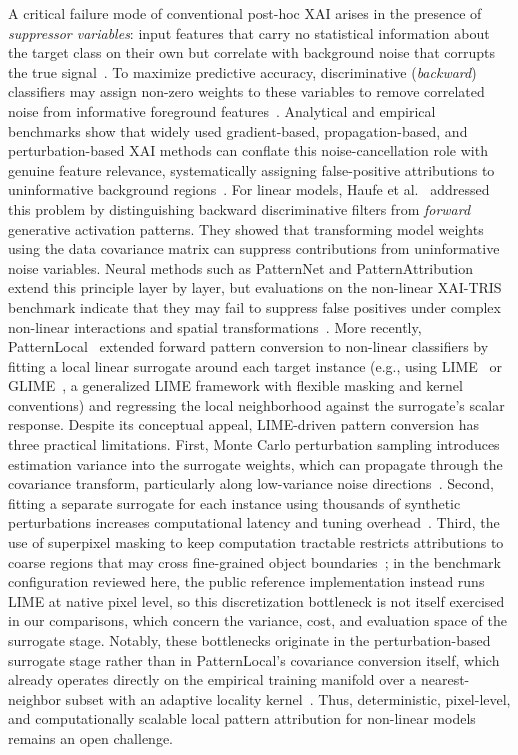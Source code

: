 \documentclass[pdflatex,sn-mathphys-num]{sn-jnl}
\theoremstyle{thmstyleone}
\theoremstyle{thmstyletwo}%
\theoremstyle{thmstylethree}%
\begin{document}
A critical failure mode of conventional post-hoc XAI arises in the presence of \emph{suppressor variables}: input features that carry no statistical information about the target class on their own but correlate with background noise that corrupts the true signal~\cite{conger1974revised, friedman2005graphical, haufe2014, weichwald2015causal}. To maximize predictive accuracy, discriminative (\emph{backward}) classifiers may assign non-zero weights to these variables to remove correlated noise from informative foreground features~\cite{haufe2014, wilming2022}. Analytical and empirical benchmarks show that widely used gradient-based, propagation-based, and perturbation-based XAI methods can conflate this noise-cancellation role with genuine feature relevance, systematically assigning false-positive attributions to uninformative background regions~\cite{wilming2022, wilming2023theoretical, clark2024, oliveira2024benchmarking}. For linear models, Haufe et al.~\cite{haufe2014} addressed this problem by distinguishing backward discriminative filters from \emph{forward} generative activation patterns. They showed that transforming model weights using the data covariance matrix can suppress contributions from uninformative noise variables. Neural methods such as PatternNet and PatternAttribution~\cite{kindermans2018learning} extend this principle layer by layer, but evaluations on the non-linear XAI-TRIS benchmark indicate that they may fail to suppress false positives under complex non-linear interactions and spatial transformations~\cite{clark2024}. More recently, PatternLocal~\cite{gjoelbye2025} extended forward pattern conversion to non-linear classifiers by fitting a local linear surrogate around each target instance (e.g., using LIME~\cite{ribeiro2016} or GLIME~\cite{tan2023}, a generalized LIME framework with flexible masking and kernel conventions) and regressing the local neighborhood against the surrogate's scalar response. Despite its conceptual appeal, LIME-driven pattern conversion has three practical limitations. First, Monte Carlo perturbation sampling introduces estimation variance into the surrogate weights, which can propagate through the covariance transform, particularly along low-variance noise directions~\cite{haufe2014, wilming2022}. Second, fitting a separate surrogate for each instance using thousands of synthetic perturbations increases computational latency and tuning overhead~\cite{gjoelbye2025}. Third, the use of superpixel masking to keep computation tractable restricts attributions to coarse regions that may cross fine-grained object boundaries~\cite{gjoelbye2025}; in the benchmark configuration reviewed here, the public reference implementation instead runs LIME at native pixel level, so this discretization bottleneck is not itself exercised in our comparisons, which concern the variance, cost, and evaluation space of the surrogate stage. Notably, these bottlenecks originate in the perturbation-based surrogate stage rather than in PatternLocal's covariance conversion itself, which already operates directly on the empirical training manifold over a nearest-neighbor subset with an adaptive locality kernel~\cite{gjoelbye2025}. Thus, deterministic, pixel-level, and computationally scalable local pattern attribution for non-linear models remains an open challenge.
\end{document}

